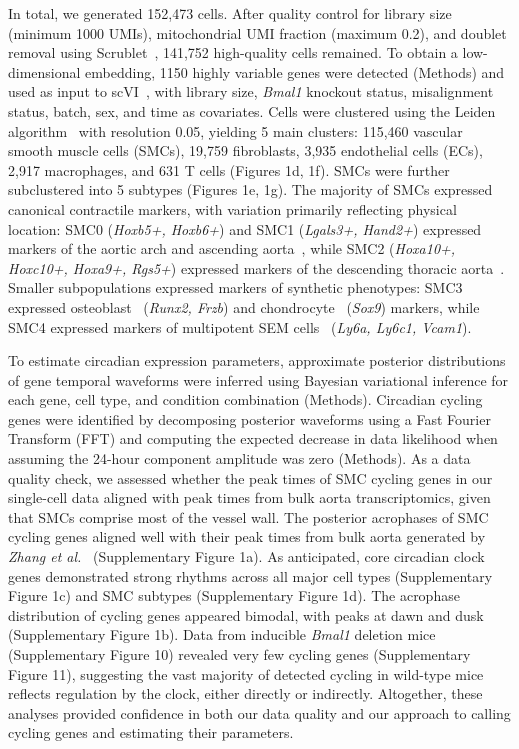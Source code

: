 \documentclass[12pt]{article}
\begin{document}
In total, we generated 152,473 cells. After quality control for library size (minimum 1000 UMIs),
mitochondrial UMI fraction (maximum 0.2), and doublet removal using Scrublet~\cite{ref25}, 141,752
high-quality cells remained. To obtain a low-dimensional embedding, 1150 highly variable genes were
detected (Methods) and used as input to scVI~\cite{ref26}, with library size, \textit{Bmal1}
knockout status, misalignment status, batch, sex, and time as covariates. Cells were clustered using
the Leiden algorithm~\cite{ref27} with resolution 0.05, yielding 5 main clusters: 115,460 vascular
smooth muscle cells (SMCs), 19,759 fibroblasts, 3,935 endothelial cells (ECs), 2,917 macrophages,
and 631 T cells (Figures 1d, 1f). SMCs were further subclustered into 5 subtypes
(Figures 1e, 1g). The majority of SMCs expressed canonical contractile markers, with
variation primarily reflecting physical location: SMC0 (\textit{Hoxb5+, Hoxb6+}) and SMC1
(\textit{Lgals3+, Hand2+}) expressed markers of the aortic arch and ascending
aorta~\cite{ref28,ref29,ref30}, while SMC2 (\textit{Hoxa10+, Hoxc10+, Hoxa9+, Rgs5+}) expressed
markers of the descending thoracic aorta~\cite{ref28,ref29,ref30,ref31}. Smaller subpopulations
expressed markers of synthetic phenotypes: SMC3 expressed osteoblast~\cite{ref32,ref33}
(\textit{Runx2, Frzb}) and chondrocyte~\cite{ref34} (\textit{Sox9}) markers, while SMC4 expressed
markers of multipotent SEM cells~\cite{ref35} (\textit{Ly6a, Ly6c1, Vcam1}).

To estimate circadian expression parameters, approximate posterior distributions of gene temporal
waveforms were inferred using Bayesian variational inference for each gene, cell type, and condition
combination (Methods). Circadian cycling genes were identified by decomposing posterior waveforms
using a Fast Fourier Transform (FFT) and computing the expected decrease in data likelihood when
assuming the 24-hour component amplitude was zero (Methods). As a data quality check, we assessed
whether the peak times of SMC cycling genes in our single-cell data aligned with peak times from
bulk aorta transcriptomics, given that SMCs comprise most of the vessel wall. The posterior
acrophases of SMC cycling genes aligned well with their peak times from bulk aorta generated by
\textit{Zhang et al.}~\cite{ref36} (Supplementary Figure 1a). As anticipated, core
circadian clock genes demonstrated strong rhythms across all major cell types
(Supplementary Figure 1c) and SMC subtypes (Supplementary Figure 1d). The
acrophase distribution of cycling genes appeared bimodal, with peaks at dawn and dusk
(Supplementary Figure 1b). Data from inducible \textit{Bmal1} deletion mice (Supplementary Figure 10) revealed very few
cycling genes (Supplementary Figure 11), suggesting the vast majority of detected
cycling in wild-type mice reflects regulation by the clock, either directly or indirectly. Altogether, these analyses
provided confidence in both our data quality and our approach to calling cycling genes and
estimating their parameters.
\end{document}
